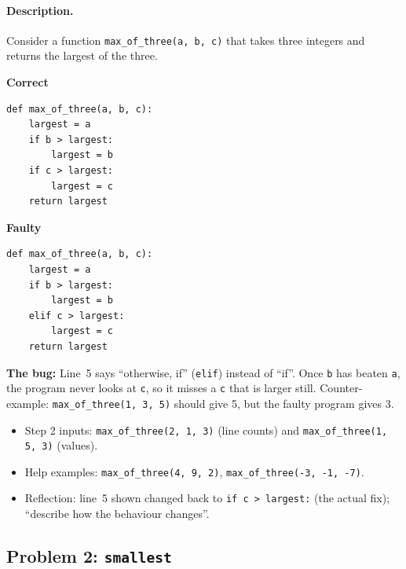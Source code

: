 \documentclass[11pt,a4paper]{article}
\newenvironment{codepair}{\par\noindent}{\par\medskip}
\newcommand{\codelabel}[1]{\textbf{\small #1}\par\vspace{2pt}}
\newcommand{\bugnote}[1]{\par\noindent\textcolor{bugred}{\textbf{The bug:}} #1\par\smallskip}
\begin{document}
\paragraph{Description.} Consider a function \texttt{max\_of\_three(a, b, c)}
that takes three integers and returns the largest of the three.

\begin{codepair}
\begin{minipage}[t]{0.48\textwidth}
\codelabel{Correct}
\begin{lstlisting}
def max_of_three(a, b, c):
    largest = a
    if b > largest:
        largest = b
    if c > largest:
        largest = c
    return largest
\end{lstlisting}
\end{minipage}\hfill
\begin{minipage}[t]{0.48\textwidth}
\codelabel{Faulty}
\begin{lstlisting}
def max_of_three(a, b, c):
    largest = a
    if b > largest:
        largest = b
    elif c > largest:
        largest = c
    return largest
\end{lstlisting}
\end{minipage}
\end{codepair}

\bugnote{Line~5 says ``otherwise, if'' (\texttt{elif}) instead of ``if''.
Once \texttt{b} has beaten \texttt{a}, the program never looks at
\texttt{c}, so it misses a \texttt{c} that is larger still.
Counter-example: \texttt{max\_of\_three(1, 3, 5)} should give 5, but the
faulty program gives 3.}

\begin{itemize}[nosep]
  \item Step 2 inputs: \texttt{max\_of\_three(2, 1, 3)} (line counts) and
        \texttt{max\_of\_three(1, 5, 3)} (values).
  \item Help examples: \texttt{max\_of\_three(4, 9, 2)},
        \texttt{max\_of\_three(-3, -1, -7)}.
  \item Reflection: line~5 shown changed back to \texttt{if c > largest:}
        (the actual fix); ``describe how the behaviour changes''.
\end{itemize}

\subsection{Problem 2: \texttt{smallest}}
\end{document}
